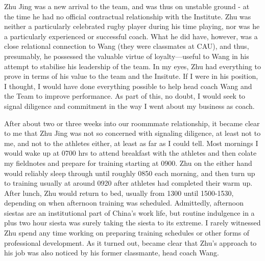 Zhu Jing was a new arrival to the team, and was thus on unstable ground - at the time he had no official contractual relationship with the Institute.  Zhu was neither a particularly celebrated rugby player during his time playing, nor was he a particularly experienced or successful coach.  What he did have, however, was a close relational connection to Wang (they were classmates at CAU), and thus, presumably, he possessed the valuable virtue of loyalty---useful to Wang in his attempt to stabilise his leadership of the team.  In my eyes, Zhu had everything to prove in terms of his value to the team and the Insitute.  If I were in his position, I thought, I would have done everything possible to help head coach Wang and the Team to improve performance.  As part of this, no doubt, I would seek to signal diligence and commitment in the way I went about my business as coach.

After about two or three weeks into our roommmate relationship, it became clear to me that Zhu Jing was not so concerned with signaling diligence, at least not to me, and not to the athletes either, at least as far as I could tell.  Most mornings I would wake up at 0700 hrs to attend breakfast with the athletes and then colate my fieldnotes and prepare for training starting at 0900. Zhu on the either hand would reliably sleep through until roughly 0850 each morning, and then turn up to training usually at around 0920 after athletes had completed their warm up.  After lunch, Zhu would return to bed, usually from 1300 until 1500-1530, depending on when afternoon training was scheduled. Admittedly, afternoon siestas are an institutional part of China's work life, but routine indulgence in a plus two hour siesta was surely taking the siesta to its extreme.  I rarely witnessed Zhu spend any time working on preparing training schedules or other forms of professional development.  As it turned out, became clear that Zhu's approach to his job was also noticed by his former classmante, head coach Wang.

